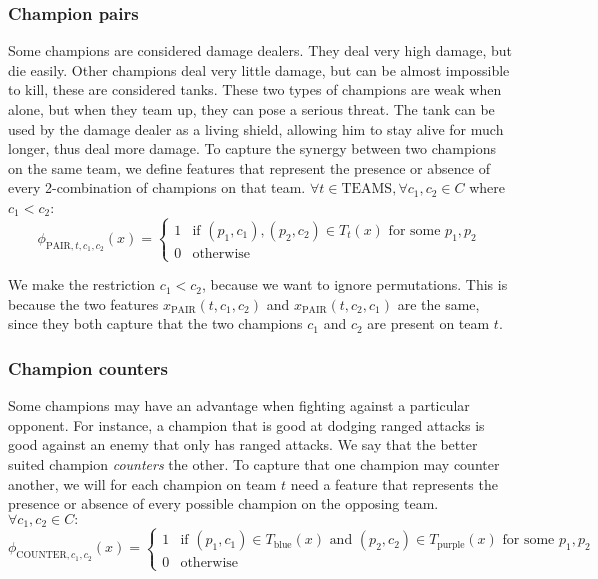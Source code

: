 \subsubsection{Champion pairs}
Some champions are considered damage dealers. They deal very high damage, but die easily. Other champions deal very little damage, but can be almost impossible to kill, these are considered tanks. These two types of champions are weak when alone, but when they team up, they can pose a serious threat. The tank can be used by the damage dealer as a living shield, allowing him to stay alive for much longer, thus deal more damage.
To capture the synergy between two champions on the same team, we define features that represent the presence or absence of every 2-combination of champions on that team. $\forall t \in \text{TEAMS}, \forall c_1, c_2 \in C$ where $c_1 < c_2$:
\begin{equation}\label{eq:pair}
\phi_{\text{PAIR}, t, c_1, c_2}(x) =
\begin{cases}
  1 & \text{if } (p_1, c_1), (p_2, c_2) \in T_t(x) \text{ for some }p_1, p_2\\
  0 & \text{otherwise}
\end{cases}
\end{equation}

We make the restriction $c_1 < c_2$, because we want to ignore permutations. This is because the two features $x_\text{PAIR}(t, c_1, c_2)$ and $x_\text{PAIR}(t, c_2, c_1)$ are the same, since they both capture that the two champions $c_1$ and $c_2$ are present on team $t$.

\subsubsection{Champion counters}
Some champions may have an advantage when fighting against a particular opponent.
For instance, a champion that is good at dodging ranged attacks is good against an enemy that only has ranged attacks.
We say that the better suited champion \emph{counters} the other.
To capture that one champion may counter another, we will for each champion on team $t$ need a feature that represents the presence or absence of every possible champion on the opposing team. $\forall c_1, c_2 \in C:$
\begin{equation}\label{eq:counter}
\phi_{\text{COUNTER},c_1,c_2}(x) = 
\begin{cases} 
1 & \text{if } (p_1, c_1) \in T_\text{blue}(x) \text{ and } (p_2, c_2) \in T_\text{purple}(x) \text{ for some } p_1, p_2 \\ 
0 & \text{otherwise} 
\end{cases}
\end{equation}

